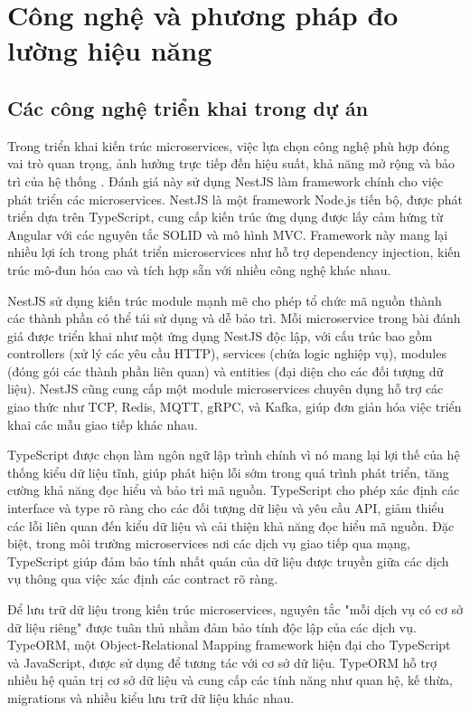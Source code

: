 \section{Công nghệ và phương pháp đo lường hiệu năng}

\subsection{Các công nghệ triển khai trong dự án}
Trong triển khai kiến trúc microservices, việc lựa chọn công nghệ phù hợp đóng vai trò quan trọng, ảnh hưởng trực tiếp đến hiệu suất, khả năng mở rộng và bảo trì của hệ thống \cite{newman2015}. Đánh giá này sử dụng NestJS làm framework chính cho việc phát triển các microservices. NestJS là một framework Node.js tiến bộ, được phát triển dựa trên TypeScript, cung cấp kiến trúc ứng dụng được lấy cảm hứng từ Angular với các nguyên tắc SOLID và mô hình MVC. Framework này mang lại nhiều lợi ích trong phát triển microservices như hỗ trợ dependency injection, kiến trúc mô-đun hóa cao và tích hợp sẵn với nhiều công nghệ khác nhau.

NestJS sử dụng kiến trúc module mạnh mẽ cho phép tổ chức mã nguồn thành các thành phần có thể tái sử dụng và dễ bảo trì. Mỗi microservice trong bài đánh giá được triển khai như một ứng dụng NestJS độc lập, với cấu trúc bao gồm controllers (xử lý các yêu cầu HTTP), services (chứa logic nghiệp vụ), modules (đóng gói các thành phần liên quan) và entities (đại diện cho các đối tượng dữ liệu). NestJS cũng cung cấp một module microservices chuyên dụng hỗ trợ các giao thức như TCP, Redis, MQTT, gRPC, và Kafka, giúp đơn giản hóa việc triển khai các mẫu giao tiếp khác nhau.

TypeScript được chọn làm ngôn ngữ lập trình chính vì nó mang lại lợi thế của hệ thống kiểu dữ liệu tĩnh, giúp phát hiện lỗi sớm trong quá trình phát triển, tăng cường khả năng đọc hiểu và bảo trì mã nguồn. TypeScript cho phép xác định các interface và type rõ ràng cho các đối tượng dữ liệu và yêu cầu API, giảm thiểu các lỗi liên quan đến kiểu dữ liệu và cải thiện khả năng đọc hiểu mã nguồn. Đặc biệt, trong môi trường microservices nơi các dịch vụ giao tiếp qua mạng, TypeScript giúp đảm bảo tính nhất quán của dữ liệu được truyền giữa các dịch vụ thông qua việc xác định các contract rõ ràng.

Để lưu trữ dữ liệu trong kiến trúc microservices, nguyên tắc "mỗi dịch vụ có cơ sở dữ liệu riêng" được tuân thủ nhằm đảm bảo tính độc lập của các dịch vụ. TypeORM, một Object-Relational Mapping framework hiện đại cho TypeScript và JavaScript, được sử dụng để tương tác với cơ sở dữ liệu. TypeORM hỗ trợ nhiều hệ quản trị cơ sở dữ liệu và cung cấp các tính năng như quan hệ, kế thừa, migrations và nhiều kiểu lưu trữ dữ liệu khác nhau.


